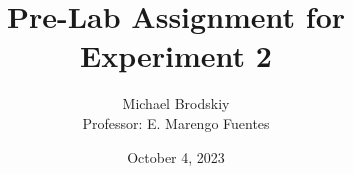 


\title{Pre-Lab Assignment for Experiment 2}
\date{October 4, 2023}
\author{Michael Brodskiy\\ \small Professor: E. Marengo Fuentes}



\maketitle

